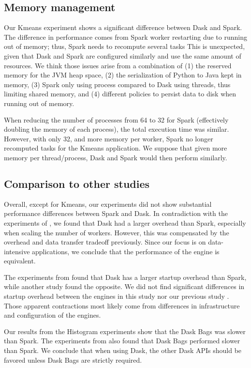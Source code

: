 \documentclass[conference]{IEEEtran}
\begin{document}
\subsection{Memory management}
Our Kmeans experiment shows a significant difference between Dask and Spark.
The difference in performance comes from Spark worker restarting due to running out of memory; thus, Spark needs to recompute several tasks
This is unexpected, given that Dask and Spark are configured similarly and use the same amount of resources.
We think those issues arise from a combination of
(1) the reserved memory for the JVM heap space,
(2) the serialization of Python to Java kept in memory,
(3) Spark only using process compared to Dask using threads, thus limiting shared memory,
and (4) different policies to persist data to disk when running out of memory.

When reducing the number of processes from 64 to 32 for Spark (effectively doubling the memory of each process), the total execution time was similar.
However, with only 32, and more memory per worker, Spark no longer recomputed tasks for the Kmeans application.
We suppose that given more memory per thread/process, Dask and Spark would then perform similarly.

\subsection{Comparison to other studies}
Overall, except for Kmeans, our experiments did not show substantial performance differences between Spark and Dask.
In contradiction with the experiments of \cite{Mehta:17}, we found that Dask had a larger overhead than Spark, especially when scaling the number of workers.
However, this was compensated by the overhead and data transfer tradeoff previously.
Since our focus is on data-intensive applications, we conclude that the performance of the engine is equivalent.

The experiments from \cite{Mehta:17} found that Dask has a larger startup overhead than Spark, while another study \cite{8588652} found the opposite.
We did not find significant differences in startup overhead between the engines in this study nor our previous study \cite{8943502}.
Those apparent contractions most likely come from differences in infrastructure and configuration of the engines.

Our results from the Histogram experiments show that the Dask Bags was slower than Spark.
The experiments from \cite{10.1145/3225058.3225128} also found that Dask Bags performed slower than Spark.
We conclude that when using Dask, the other Dask APIs should be favored unless Dask Bags are strictly required.
\end{document}
